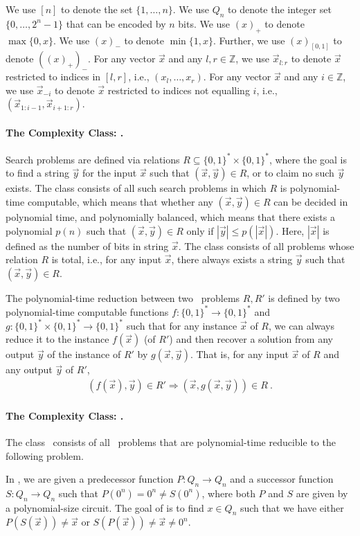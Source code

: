 
We use $[n]$ to denote the set $\{1,\dots, n\}$.
We use $Q_n$ to denote the integer set $\{0,\dots, 2^n-1\}$ that can be encoded by $n$ bits. 
We use $(x)_+$ to denote $\max\{0,x\}$.
We use $(x)_-$ to denote $\min\{1,x\}$.
Further, we use $(x)_{[0,1]}$ to denote $((x)_+)_-$.
For any vector $\vec{x}$ and any $l,r\in \mathbb{Z}$, we use $\vec{x}_{l:r}$ to denote $\vec{x}$ restricted to indices in $[l,r]$, i.e., $(x_l,\dots,x_r)$.
For any vector $\vec{x}$ and any $i\in \mathbb{Z}$, we use $\vec{x}_{-i}$ to denote $\vec{x}$ restricted to indices not equalling $i$, i.e., $(\vec{x}_{1:i-1}, \vec{x}_{i+1:r})$.

\paragraph{The Complexity Class: \TFNP.}
Search problems are defined via relations $R\subseteq \{0,1\}^*\times \{0,1\}^*$, where the goal is to find a string $\vec{y}$ for the input $\vec{x}$ such that $(\vec{x},\vec{y})\in R$, or to claim no such $\vec{y}$ exists. 
The class {\FNP\xspace} consists of all such search problems in which $R$ is polynomial-time computable, which means that whether any $(\vec{x},\vec{y})\in R$ can be decided in polynomial time, and polynomially balanced, which means that there exists a polynomial $p(n)$ such that $(\vec{x},\vec{y})\in R$ only if $|\vec{y}|\leq p(|\vec{x}|)$. 
Here, $|\vec{x}|$ is defined as the number of bits in string $\vec{x}$.
The class {\TFNP\xspace} consists of all {\FNP\xspace} problems whose relation $R$ is total, i.e., for any input $\vec{x}$, there always exists a string $\vec{y}$ such that $(\vec{x}, \vec{y})\in R$.

The polynomial-time reduction between two \TFNP~problems $R,R'$ is defined by two polynomial-time computable functions $f:\{0,1\}^*\to \{0,1\}^*$ and $g:\{0,1\}^*\times \{0,1\}^* \to \{0,1\}^*$ such that for any instance $\vec{x}$ of $R$, we can always reduce it to the instance $f(\vec{x})$ (of $R'$) and then recover a solution from any output $\vec{y}$ of the instance of $R'$ by $g(\vec{x}, \vec{y})$.
That is, for any input $\vec{x}$ of $R$ and any output $ \vec{y}$ of $R'$,
\begin{align*}
    (f(\vec{x}),\vec{y}) \in R' \Longrightarrow (\vec{x},g(\vec{x},\vec{y})) \in R~.
\end{align*}

\paragraph{The Complexity Class: \PPAD.}
The class 
\PPAD~consists of all \TFNP~problems that are polynomial-time reducible to the following \EoL problem.
\begin{definition}[\EoL]
    In \EoL, we are given a predecessor function $P:Q_n\to Q_n$ and a successor function $S:Q_n\to Q_n$ such that $P(0^n)=0^n\neq S(0^n)$, where both $P$ and $S$ are given by a polynomial-size circuit. The goal of \EoL is to find $x\in Q_n$ such that we have either $P(S(\vec{x}))\neq \vec{x}$ or $S(P(\vec{x}))\neq \vec{x} \neq 0^n$.
\end{definition}


